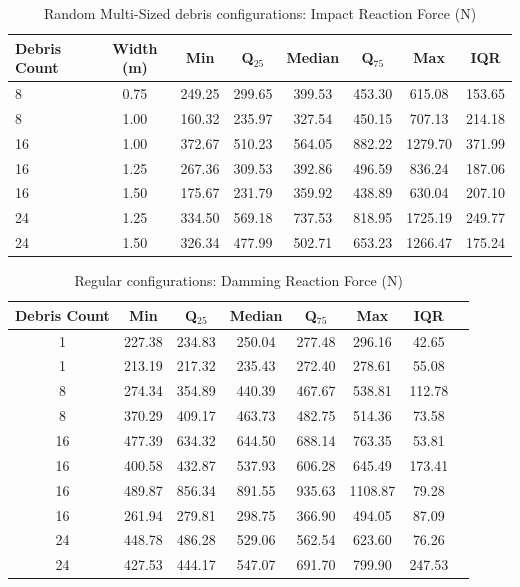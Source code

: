 \documentclass{article}
\begin{document}
{\begin{table}[h!]
\centering
\caption{Random Multi-Sized debris configurations: Impact Reaction Force (N)}
\begin{tabular}{lccccccc}
\toprule
\textbf{Debris Count} & \textbf{Width (m)} & \textbf{Min} & \textbf{Q$_{25}$} & \textbf{Median} & \textbf{Q$_{75}$} & \textbf{Max} & \textbf{IQR} \\
\midrule
8 & 0.75 & 249.25 & 299.65 & 399.53 & 453.30 & 615.08 & 153.65 \\
8 & 1.00 & 160.32 & 235.97 & 327.54 & 450.15 & 707.13 & 214.18 \\
16 & 1.00 & 372.67 & 510.23 & 564.05 & 882.22 & 1279.70 & 371.99 \\
16 & 1.25 & 267.36 & 309.53 & 392.86 & 496.59 & 836.24 & 187.06 \\
16 & 1.50 & 175.67 & 231.79 & 359.92 & 438.89 & 630.04 & 207.10 \\
24 & 1.25 & 334.50 & 569.18 & 737.53 & 818.95 & 1725.19 & 249.77 \\
24 & 1.50 & 326.34 & 477.99 & 502.71 & 653.23 & 1266.47 & 175.24 \\
\bottomrule
\end{tabular}
\end{table}


\begin{table}[h!]
\centering
\caption{Regular configurations: Damming Reaction Force (N)}
\begin{tabular}{cccccccc}
\toprule
\textbf{Debris Count} & \textbf{Min} & \textbf{Q$_{25}$} & \textbf{Median} & \textbf{Q$_{75}$} & \textbf{Max} & \textbf{IQR} \\
\midrule
1 & 227.38 & 234.83 & 250.04 & 277.48 & 296.16 & 42.65 \\
1 & 213.19 & 217.32 & 235.43 & 272.40 & 278.61 & 55.08 \\
8 & 274.34 & 354.89 & 440.39 & 467.67 & 538.81 & 112.78 \\
8 & 370.29 & 409.17 & 463.73 & 482.75 & 514.36 & 73.58 \\
16 & 477.39 & 634.32 & 644.50 & 688.14 & 763.35 & 53.81 \\
16 & 400.58 & 432.87 & 537.93 & 606.28 & 645.49 & 173.41 \\
16 & 489.87 & 856.34 & 891.55 & 935.63 & 1108.87 & 79.28 \\
16 & 261.94 & 279.81 & 298.75 & 366.90 & 494.05 & 87.09 \\
24 & 448.78 & 486.28 & 529.06 & 562.54 & 623.60 & 76.26 \\
24 & 427.53 & 444.17 & 547.07 & 691.70 & 799.90 & 247.53 \\
\bottomrule
\end{tabular}
\end{table}

}
\end{document}

